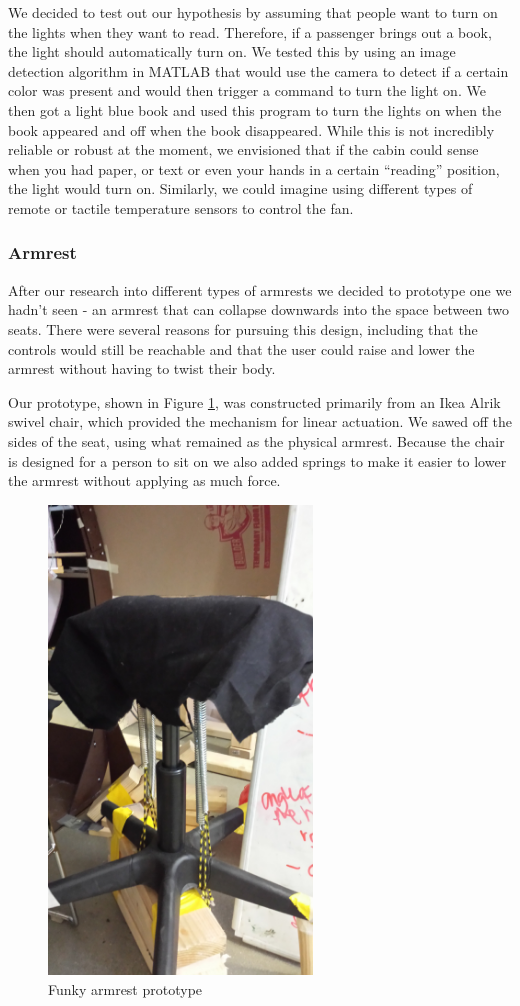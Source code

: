 We decided to test out our hypothesis by assuming that people want to turn on the lights when they want to read. Therefore, if a passenger brings out a book, the light should automatically turn on. We tested this by using an image detection algorithm in MATLAB that would use the camera to detect if a certain color was present and would then trigger a command to turn the light on. We then got a light blue book and used this program to turn the lights on when the book appeared and off when the book disappeared. While this is not incredibly reliable or robust at the moment, we envisioned that if the cabin could sense when you had paper, or text or even your hands in a certain “reading” position, the light would turn on. Similarly, we could imagine using different types of remote or tactile temperature sensors to control the fan.

\subsubsection*{Armrest}
After our research into different types of armrests we decided to prototype one we hadn't seen - an armrest that can collapse downwards into the space between two seats. There were several reasons for pursuing this design, including that the controls would still be reachable and that the user could raise and lower the armrest without having to twist their body.

Our prototype, shown in Figure \ref{fig:armrest_funky}, was constructed primarily from an Ikea Alrik swivel chair, which provided the mechanism for linear actuation. We sawed off the sides of the seat, using what remained as the physical armrest. Because the chair is designed for a person to sit on we also added springs to make it easier to lower the armrest without applying as much force.


\begin{figure}[h]
  \centering
     \includegraphics[width=7cm]{images/armrest_funky.jpg}
   \caption{Funky armrest prototype}
  \label{fig:armrest_funky}
\end{figure}


